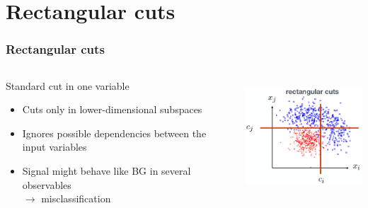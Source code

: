 \documentclass{beamer}
\begin{document}

\section{Rectangular cuts} %
\begin{frame}
    \frametitle{Rectangular cuts}
    \begin{columns}[T] %
        \begin{column}{.48\textwidth}
            \vspace*{-10mm}
            Standard cut in one variable
            \begin{itemize}
                \item<1-> Cuts only in lower-dimensional subspaces
                \item<2-> Ignores possible dependencies between the input variables
                \item<3-> Signal might behave like BG in several observables\\ $\to$ misclassification
            \end{itemize}
        \end{column}%
        \hfill%
        \begin{column}{.48\textwidth}
            \vspace*{-10mm}
            \raggedright\includegraphics[height=4.3cm,keepaspectratio]{pics/mva_cuts_rectangular.png}%
            
        \end{column}%
    \end{columns}

\end{frame}

\end{document}
